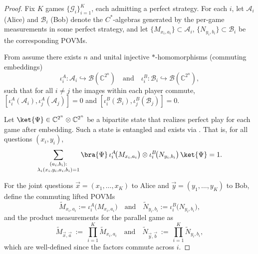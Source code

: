 \documentclass{article}
\begin{document}
    \begin{proof}
    Fix $K$ games $\{\mathcal{G}_i\}_{i=1}^K$, each admitting a perfect strategy. For each $i$, let $\mathcal{A}_i$ (Alice) and $\mathcal{B}_i$ (Bob) denote the $C^*$-algebras generated by the per-game measurements in some perfect strategy, and let $\{M_{x_i,a_i}\}\subset\mathcal{A}_i$, $\{N_{y_i,b_i}\}\subset\mathcal{B}_i$ be the corresponding POVMs.

   From  assume there exists $n$ and unital injective $*$-homomorphisms (commuting embeddings)
    \begin{equation}
        \iota_i^A:\mathcal{A}_i\hookrightarrow \mathcal{B}(\mathbb{C}^{2^n}) \quad\text{and}\quad \iota_i^B:\mathcal{B}_i\hookrightarrow \mathcal{B}(\mathbb{C}^{2^n}),
    \end{equation}
    such that for all $i\neq j$ the images within each player commute,
    $[\iota_i^A(\mathcal{A}_i),\iota_j^A(\mathcal{A}_j)]=0$ and
    $[\iota_i^B(\mathcal{B}_i),\iota_j^B(\mathcal{B}_j)]=0$.
    
    Let $\ket{\Psi}\in\mathbb{C}^{2^n}\otimes\mathbb{C}^{2^n}$ be a bipartite state that realizes perfect play for each game after embedding. Such a state is entangled and exists via . That is, for all questions $(x_i,y_i)$,
    \begin{equation}\label{eq: embedded expectation}
    \sum_{\substack{(a_i,b_i):\\ \lambda_i(x_i,y_i,a_i,b_i)=1}}
    \bra{\Psi}\,\iota_i^A\!\big(M_{x_i,a_i}\big)\otimes
                 \iota_i^B\!\big(N_{y_i,b_i}\big)\,\ket{\Psi}=1.
    \end{equation}

    For the joint questions $\vec{x}=(x_1,\dots,x_K)$ to Alice and $\vec{y}=(y_1,\dots,y_K)$ to Bob, define the commuting lifted POVMs
    \begin{equation}
        \widetilde M_{x_i,a_i}:=\iota_i^A\!\big(M_{x_i,a_i}\big)\quad\text{and}\quad \widetilde N_{y_i,b_i}:=\iota_i^B\!\big(N_{y_i,b_i}\big),
    \end{equation}
    and the product measurements for the parallel game as 
    \begin{equation}
        \widetilde M_{\vec{x},\vec{a}}\ :=\ \prod_{i=1}^K \widetilde M_{x_i,a_i}\quad\text{and}\quad  \widetilde N_{\vec{y},\vec{b}}\ :=\ \prod_{i=1}^K \widetilde N_{y_i,b_i},
    \end{equation}
    which are well-defined since the factors commute across $i$.


\end{proof}
\end{document}
